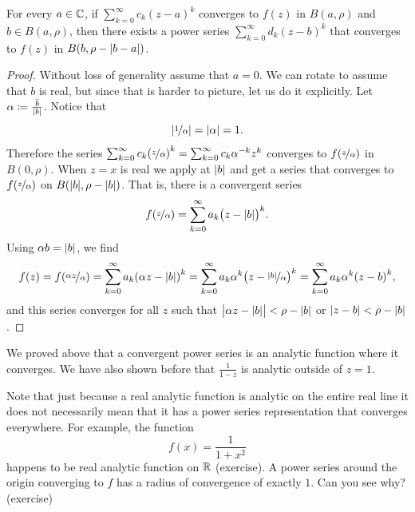 \begin{cor} \label{cor:powerseranalytic}
For every $a \in {\mathbb{C}}$,
if $\sum_{k=0}^\infty c_k {(z-a)}^k$ converges to $f(z)$ in $B(a,\rho)$ and $b \in
B(a,\rho)$,
then there exists a power series
$\sum_{k=0}^\infty d_k {(z-b)}^k$ that converges to $f(z)$ in $B(b,\rho-\lvert {b-a} \rvert)$.
\end{cor}

\begin{proof}
Without loss of generality assume that $a=0$.  We can rotate to assume that $b$ is real, but
since that is harder to picture, let us do it explicitly.
Let $\alpha \coloneqq \frac{\bar{b}}{\lvert {b} \rvert}$.
Notice that
\begin{equation*}
\left\lvert {\nicefrac{1}{\alpha}} \right\rvert = \lvert {\alpha} \rvert
= 1 .
\end{equation*}
Therefore the series
$\sum_{k=0}^\infty c_k {(\nicefrac{z}{\alpha})}^k = 
\sum_{k=0}^\infty c_k \alpha^{-k} {z}^k$
converges to $f(\nicefrac{z}{\alpha})$ in $B(0,\rho)$.
When $z=x$ is real
we apply  at $\lvert {b} \rvert$ and get
a series that converges
to $f(\nicefrac{z}{\alpha})$ on $B(\lvert {b} \rvert,\rho-\lvert {b} \rvert)$.
That is, there is a convergent series
\begin{equation*}
f(\nicefrac{z}{\alpha}) =
\sum_{k=0}^\infty a_k {\bigl(z - \lvert {b} \rvert\bigr)}^k .
\end{equation*}
Using $\alpha b = \lvert {b} \rvert$, we find
\begin{equation*}
f(z) = f(\nicefrac{\alpha z}{\alpha}) =
\sum_{k=0}^\infty a_k {(\alpha z - \lvert {b} \rvert)}^k 
=
\sum_{k=0}^\infty a_k\alpha^k {\bigl(z - \nicefrac{\lvert {b} \rvert}{\alpha}\bigr)}^k
=
\sum_{k=0}^\infty a_k\alpha^k {(z - b)}^k ,
\end{equation*}
and this series converges for all $z$ such that
$\bigl\lvert \alpha z-\lvert {b} \rvert\bigr\rvert < \rho-\lvert {b} \rvert$
or $\lvert {z - b} \rvert < \rho-\lvert {b} \rvert$.
\end{proof}

We proved above that a convergent power series is an
analytic function where it converges.  We have also shown before that
$\frac{1}{1-z}$ is analytic outside of $z=1$.

Note that just because a real analytic function is analytic on the
entire real line it does not necessarily mean that it has a power series
representation that converges everywhere.  For example, the function
\begin{equation*}
f(x) = \frac{1}{1+x^2}
\end{equation*}
happens to be real analytic function on ${\mathbb{R}}$ (exercise).  A power
series around the origin converging to $f$
has a radius of convergence of exactly $1$.
Can you see why? (exercise)

